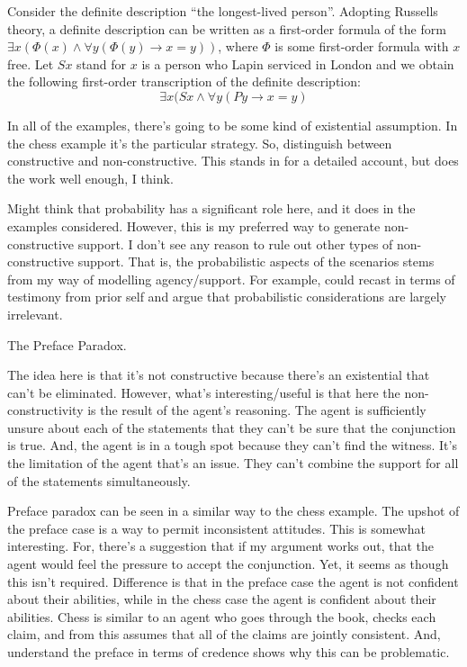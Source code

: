 \documentclass[10pt]{article}
\begin{document}
Consider the definite description ``the longest-lived person''.
Adopting Russells theory, a definite description can be written as a first-order formula of the form \(\exists x(\Phi(x) \land \forall y(\Phi(y) \rightarrow x = y))\), where \(\Phi\) is some first-order formula with \(x\) free.
Let \(Sx\) stand for \(x\) is a person who Lapin serviced in London and we obtain the following first-order transcription of the definite description:
\[\exists x(Sx \land \forall y(Py \rightarrow x = y)\]



In all of the examples, there's going to be some kind of existential assumption.
In the chess example it's the particular strategy.
So, distinguish between constructive and non-constructive.
This stands in for a detailed account, but does the work well enough, I think.

Might think that probability has a significant role here, and it does in the examples considered.
However, this is my preferred way to generate non-constructive support.
I don't see any reason to rule out other types of non-constructive support.
That is, the probabilistic aspects of the scenarios stems from my way of modelling agency/support.
For example, could recast in terms of testimony from prior self and argue that probabilistic considerations are largely irrelevant.


\begin{example}
  The Preface Paradox.

  The idea here is that it's not constructive because there's an existential that can't be eliminated.
  However, what's interesting/useful is that here the non-constructivity is the result of the agent's reasoning.
  The agent is sufficiently unsure about each of the statements that they can't be sure that the conjunction is true.
  And, the agent is in a tough spot because they can't find the witness.
  It's the limitation of the agent that's an issue.
  They can't combine the support for all of the statements simultaneously.
\end{example}

Preface paradox can be seen in a similar way to the chess example.
The upshot of the preface case is a way to permit inconsistent attitudes.
This is somewhat interesting.
For, there's a suggestion that if my argument works out, that the agent would feel the pressure to accept the conjunction.
Yet, it seems as though this isn't required.
Difference is that in the preface case the agent is not confident about their abilities, while in the chess case the agent is confident about their abilities.
Chess is similar to an agent who goes through the book, checks each claim, and from this assumes that all of the claims are jointly consistent.
And, understand the preface in terms of credence shows why this can be problematic.
\end{document}
